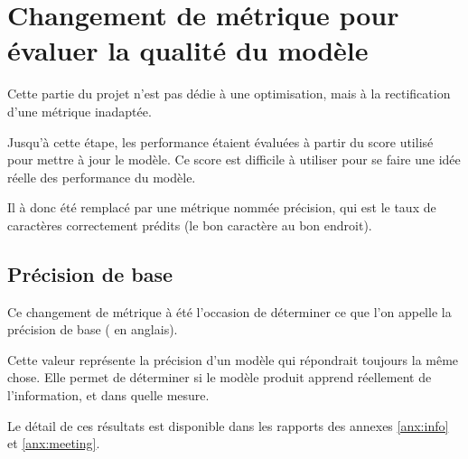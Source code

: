 \section{Changement de métrique pour évaluer la qualité du modèle}
Cette partie du projet n'est pas dédie à une optimisation, mais à la rectification d'une métrique inadaptée.

Jusqu'à cette étape, les performance étaient évaluées à partir du score utilisé pour mettre à jour le modèle. Ce score est difficile à utiliser pour se faire une idée réelle des performance du modèle. 

Il à donc été remplacé par une métrique nommée \og précision\fg{}, qui est le taux de caractères correctement prédits (le bon caractère au bon endroit).

\subsection{Précision de base}
Ce changement de métrique à été l'occasion de déterminer ce que l'on appelle la précision de base ( en anglais).

Cette valeur représente la précision d'un modèle qui répondrait toujours la même chose.
Elle permet de déterminer si le modèle produit apprend réellement de l'information, et dans quelle mesure.

Le détail de ces résultats est disponible dans les rapports des annexes \ref{anx:info} et \ref{anx:meeting}.

